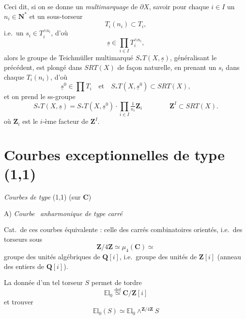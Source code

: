 \documentclass[11pt,a4paper]{article}
\begin{document}

Ceci dit, si on se donne un \emph{multimarquage} de $\partial X$, savoir
pour chaque $i \in I$ un $n_i \in \mathbf{N}^{*}$ et un sous-torseur
\[
T_i(n_i) \subset T_i,
\]
 i.e.\ un $s_i \in T_i^{\wedge n_i}$, d'où
\[
\underline{s} \in \prod_{i\in I} T_i^{\wedge n_i},
\]
alors le groupe de Teichmüller multimarqué $S_{*}T(X, \underline{s})$,
généralisant le précédent, est plongé dans $SRT(X)$ de façon naturelle,
en prenant un $s_i$ dans chaque $T_i(n_i)$, d'où
\[
\underline{s}^{0} \in \prod T_i \quad\text{et}\quad
S_{*}T(X, \underline{s}^{0}) \subset SRT(X),
\]
et on prend le ss-groupe
\[
S_{*}T(X, \underline{s}) = S_{*}T(X, \underline{s}^{0}) \cdot
\prod_{i\in I} \tfrac{1}{n_i}\mathbf{Z}_i
\qquad\qquad \mathbf{Z}^{I} \subset SRT(X).
\]
où $\mathbf{Z}_i$ est le $i$-ème facteur de $\mathbf{Z}^{I}$.

\section{Courbes exceptionnelles de type (1,1)}


\emph{Courbes}  \emph{de type} (1,1) (sur
$\mathbf{C}$)

A) \emph{Courbe} \ \emph{anharmonique de type carré}

Cat.\ de ces courbes équivalente : celle des carrés combinatoires
orientés, i.e.\ des torseurs sous
\[
\mathbf{Z}/4\mathbf{Z} \simeq \mu_4(\mathbf{C}) \simeq
\]
groupe des unités algébriques de $\mathbf{Q}[i]$, i.e.\ groupe des unités
de $\mathbf{Z}[i]$ (anneau des entiers de $\mathbf{Q}[i]$).

La donnée d'un tel torseur $S$ permet de tordre
\[
\mathbb{E}\mathrm{l}_0 \overset{\mathrm{def}}{\simeq} \mathbf{C}/\mathbf{Z}[i]
\]
et trouver
\[
\mathbb{E}\mathrm{l}_0(S) \simeq \mathbb{E}\mathrm{l}_0 \wedge^{\mathbf{Z}/4\mathbf{Z}} S
\]
\end{document}
